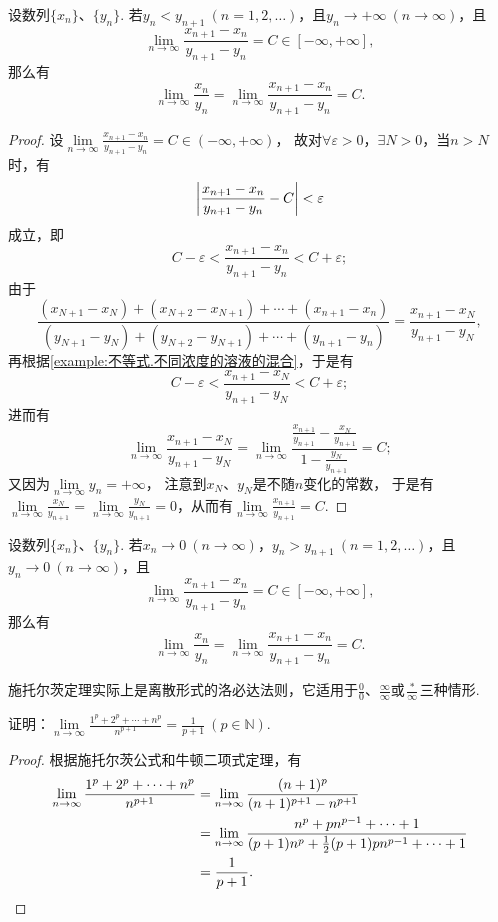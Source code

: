 \begin{theorem}[施托尔茨定理I]\label{theorem:极限.施托尔茨定理1}
设数列\(\{x_n\}\)、\(\{y_n\}\).
若\(y_n < y_{n+1}\ (n=1,2,\dotsc)\)，且\(y_n \to +\infty\ (n\to\infty)\)，且\[
\lim\limits_{n\to\infty} \frac{x_{n+1}-x_n}{y_{n+1}-y_n} = C\in[-\infty,+\infty],
\]那么有\[
\lim\limits_{n\to\infty} \frac{x_n}{y_n}
= \lim\limits_{n\to\infty} \frac{x_{n+1}-x_n}{y_{n+1}-y_n}
= C.
\]
\begin{proof}%
设\(\lim\limits_{n\to\infty} \frac{x_{n+1}-x_n}{y_{n+1}-y_n} = C\in(-\infty,+\infty)\)，
故对\(\forall\varepsilon>0\)，\(\exists N>0\)，当\(n > N\)时，有\[
\abs{\frac{x_{n+1}-x_n}{y_{n+1}-y_n} - C} < \varepsilon
\]成立，即\[
C - \varepsilon < \frac{x_{n+1}-x_n}{y_{n+1}-y_n} < C + \varepsilon;
\]
由于\[
\frac{
(x_{N+1}-x_N)
+ (x_{N+2}-x_{N+1})
+ \dotsb
+ (x_{n+1}-x_n)
}{
(y_{N+1}-y_N)
+ (y_{N+2}-y_{N+1})
+ \dotsb
+ (y_{n+1}-y_n)
}
= \frac{x_{n+1}-x_N}{y_{n+1}-y_N},
\]再根据\cref{example:不等式.不同浓度的溶液的混合}，于是有\[
C - \varepsilon <
\frac{x_{n+1}-x_N}{y_{n+1}-y_N}
< C + \varepsilon;
\]进而有\[
\lim\limits_{n\to\infty} \frac{x_{n+1}-x_N}{y_{n+1}-y_N}
= \lim\limits_{n\to\infty} \frac{\frac{x_{n+1}}{y_{n+1}}-\frac{x_N}{y_{n+1}}}{1-\frac{y_N}{y_{n+1}}}
= C;
\]又因为\(\lim\limits_{n\to\infty} y_n = +\infty\)，
注意到\(x_N\)、\(y_N\)是不随\(n\)变化的常数，
于是有\(\lim\limits_{n\to\infty} \frac{x_N}{y_{n+1}}
= \lim\limits_{n\to\infty} \frac{y_N}{y_{n+1}}
= 0\)，从而有\(\lim\limits_{n\to\infty} \frac{x_{n+1}}{y_{n+1}} = C\).
\end{proof}
\end{theorem}

\begin{theorem}[施托尔茨定理II]\label{theorem:极限.施托尔茨定理2}
设数列\(\{x_n\}\)、\(\{y_n\}\).
若\(x_n\to0\ (n\to\infty)\)，\(y_n > y_{n+1}\ (n=1,2,\dotsc)\)，且\(y_n\to0\ (n\to\infty)\)，且\[
\lim\limits_{n\to\infty} \frac{x_{n+1}-x_n}{y_{n+1}-y_n} = C\in[-\infty,+\infty],
\]那么有\[
\lim\limits_{n\to\infty} \frac{x_n}{y_n}
= \lim\limits_{n\to\infty} \frac{x_{n+1}-x_n}{y_{n+1}-y_n}
= C.
\]
\end{theorem}

施托尔茨定理实际上是离散形式的洛必达法则，它适用于\(\frac{0}{0}\)、\(\frac{\infty}{\infty}\)或\(\frac{*}{\infty}\)三种情形.

\begin{example}\label{example:极限.解极限常用公式方法.例1}
证明：\(\lim\limits_{n\to\infty} \frac{1^p+2^p+\dotsb+n^p}{n^{p+1}}
= \frac{1}{p+1}\ (p\in\mathbb{N})\).
\begin{proof}
根据施托尔茨公式和牛顿二项式定理，有\begin{align*}
	\lim\limits_{n\to\infty} \frac{1^p+2^p+\dotsb+n^p}{n^{p+1}}
	&= \lim\limits_{n\to\infty} \frac{(n+1)^p}{(n+1)^{p+1} - n^{p+1}} \\
	&= \lim\limits_{n\to\infty} \frac{n^p + p n^{p-1} + \dotsb + 1}
		{(p+1) n^p + \frac{1}{2} (p+1) p n^{p-1} + \dotsb + 1} \\
	&= \frac{1}{p+1}.
	\qedhere
\end{align*}
\end{proof}
\end{example}


